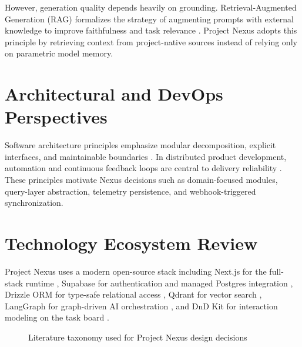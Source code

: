 \documentclass[a4paper, 11pt, oneside]{Dissertation}
\begin{document}
However, generation quality depends heavily on grounding. Retrieval-Augmented Generation (RAG) formalizes the strategy of augmenting prompts with external knowledge to improve faithfulness and task relevance \cite{lewis2020rag,gao2023retrieval}. Project Nexus adopts this principle by retrieving context from project-native sources instead of relying only on parametric model memory.

\section{Architectural and DevOps Perspectives}
Software architecture principles emphasize modular decomposition, explicit interfaces, and maintainable boundaries \cite{bass2021software}. In distributed product development, automation and continuous feedback loops are central to delivery reliability \cite{humble2010continuous}. These principles motivate Nexus decisions such as domain-focused modules, query-layer abstraction, telemetry persistence, and webhook-triggered synchronization.

\section{Technology Ecosystem Review}
Project Nexus uses a modern open-source stack including Next.js for the full-stack runtime \cite{nextjsDocs2026}, Supabase for authentication and managed Postgres integration \cite{supabaseDocs2026}, Drizzle ORM for type-safe relational access \cite{drizzleDocs2026}, Qdrant for vector search \cite{qdrantDocs2026}, LangGraph for graph-driven AI orchestration \cite{langgraphDocs2026}, and DnD Kit for interaction modeling on the task board \cite{dndkitDocs2026}.

\begin{figure}[H]
\centering
{}
\caption{Literature taxonomy used for Project Nexus design decisions}
\label{fig:literature-taxonomy}
\end{figure}
\end{document}
